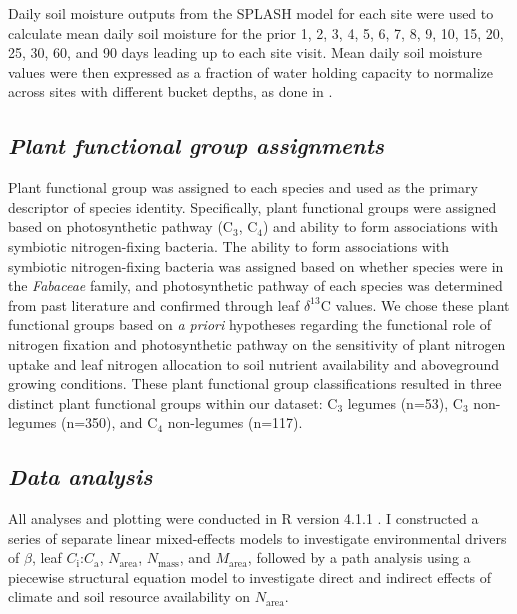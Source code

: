 Daily soil moisture outputs from the SPLASH model for each site were used to calculate mean daily soil moisture for the prior 1, 2, 3, 4, 5, 6, 7, 8, 9, 10, 15, 20, 25, 30, 60, and 90 days leading up to each site visit. Mean daily soil moisture values were then expressed as a fraction of water holding capacity to normalize across sites with different bucket depths, as done in .

\subsection{\textit{Plant functional group assignments}}
\noindent Plant functional group was assigned to each species and used as the primary descriptor of species identity. Specifically, plant functional groups were assigned based on photosynthetic pathway (C$_3$, C$_4$) and ability to form associations with symbiotic nitrogen-fixing bacteria. The ability to form associations with symbiotic nitrogen-fixing bacteria was assigned based on whether species were in the \textit{Fabaceae} family, and photosynthetic pathway of each species was determined from past literature and confirmed through leaf $\delta^{13}$C values. We chose these plant functional groups based on \textit{a priori} hypotheses regarding the functional role of nitrogen fixation and photosynthetic pathway on the sensitivity of plant nitrogen uptake and leaf nitrogen allocation to soil nutrient availability and aboveground growing conditions. These plant functional group classifications resulted in three distinct plant functional groups within our dataset: C$_3$ legumes (n=53), C$_3$ non-legumes (n=350), and C$_4$ non-legumes (n=117).

\subsection{\textit{Data analysis}}
\noindent All analyses and plotting were conducted in R version 4.1.1 . I constructed a series of separate linear mixed-effects models to investigate environmental drivers of $\beta$, leaf $C_\mathrm{i}$:$C_\mathrm{a}$, $N_\mathrm{area}$, $N_\mathrm{mass}$, and $M_\mathrm{area}$, followed by a path analysis using a piecewise structural equation model to investigate direct and indirect effects of climate and soil resource availability on $N_\mathrm{area}$.


